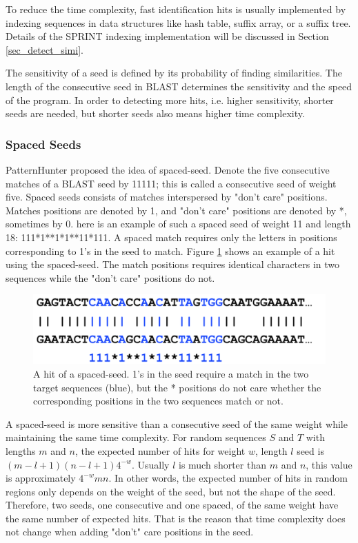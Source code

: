 To reduce the time complexity, fast identification hits is usually implemented by indexing sequences in data structures like hash table, suffix array, or a suffix tree. Details of the SPRINT indexing implementation will be discussed in Section \ref{sec_detect_simi}. 

The sensitivity of a seed is defined by its probability of finding similarities. The length of the consecutive seed in BLAST determines the sensitivity and the speed of the program. In order to detecting more hits, i.e. higher sensitivity, shorter seeds are needed, but shorter seeds also means higher time complexity.

\subsubsection{Spaced Seeds}
PatternHunter proposed \cite{Ma02_PatternHunter} the idea of spaced-seed. Denote the five consecutive matches of a BLAST seed by 11111; this is called a consecutive seed of weight five. Spaced  seeds consists of matches interspersed by "don’t care" positions. Matches positions are denoted by 1, and "don't care" positions are denoted by *, sometimes by 0. here is an example of such a spaced seed of weight 11 and length 18: 111*1**1*1**11*111. A spaced match requires only the letters in positions corresponding to 1’s in the seed to match. Figure \ref{fig_hit_spaced_seed} shows an example of a hit using the spaced-seed. The match positions requires identical characters in two sequences while the "don't care" positions do not.

\begin{figure}[h!]
\begin{center}
\includegraphics[height =3.5 cm]{img/spaced_seed_hit.png}
\caption[A hit of a spaced-seed]{A hit of a spaced-seed. 1's in the seed require a match in the two target sequences (blue), but the * positions do not care whether the corresponding positions in the two sequences match or not.  \label{fig_hit_spaced_seed}}
\end{center}
\end{figure}

A spaced-seed is more sensitive than a consecutive seed of the same weight while maintaining the same time complexity. For random sequences $S$ and $T$ with lengths $m$ and $n$, the expected number of hits for weight $w$, length $l$ seed is $(m-l+1)(n-l+1)4^{-w}$. Usually $l$ is much shorter than $m$ and $n$, this value is approximately $4^{-w}mn$. In other words, the expected number of hits in random regions only depends on the weight of the seed, but not the shape of the seed. Therefore, two seeds, one consecutive and one spaced, of the same weight have the same number of expected hits. That is the reason that time complexity does not change when adding "don't" care positions in the seed.

